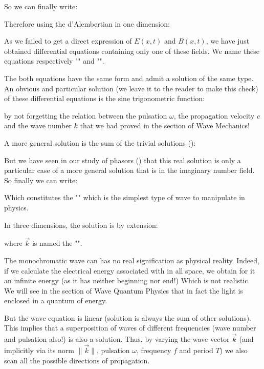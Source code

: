 	So we can finally write:
	
	Therefore using the d'Alembertian in one dimension:
	
	As we failed to get a direct expression of $E(x, t)$ and $B (x, t)$, we have just obtained differential equations containing only one of these fields. We name these equations respectively "" and "".

	The both equations have the same form and admit a solution of the same type. An obvious and particular solution (we leave it to the reader to make this check) of these differential equations is the sine trigonometric function:
	
	by not forgetting the relation between the pulsation $\omega$, the propagation velocity $c$ and the wave number $k$ that we had proved in the section of Wave Mechanics!

	A more general solution is the sum of the trivial solutions ():
	
	But we have seen in our study of phasors () that this real solution is only a particular case of a more general solution that is in the imaginary number field. So finally we can write:
	
	Which constitutes the "\label{monochromatic plane wave}" which is the simplest type of wave to manipulate in physics.

	In three dimensions, the solution is by extension:
	
	where $\vec{k}$ is named the "".
	\begin{tcolorbox}[title=Remark,colframe=black,arc=10pt]
	The monochromatic wave can has no real signification as physical reality. Indeed, if we calculate the electrical energy associated with in all space, we obtain for it an infinite energy (as it has neither beginning nor end!) Which is not realistic. We will see in the section of Wave Quantum Physics that in fact the light is enclosed in a quantum of energy.
	\end{tcolorbox}
	But the wave equation is linear (solution is always the sum of other solutions). This implies that a superposition of waves of different frequencies (wave number and pulsation also!) is also a solution. Thus, by varying the wave vector $\vec{k}$ (and implicitly via its norm $\|\vec{k}\|$, pulsation $\omega$, frequency $f$ and period $T$) we also scan all the possible directions of propagation.

